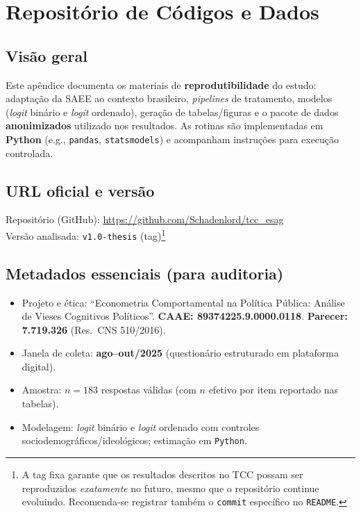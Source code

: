 \begin{apendicesenv}
\begin{landscape}
\begin{ThreePartTable}
\begin{longtable}
\bottomrule 
\insertTableNotes 
\end{longtable} 
\end{ThreePartTable}


\endgroup
\end{landscape}

\chapter{Repositório de Códigos e Dados}\label{ap:repo}

\section{Visão geral}
Este apêndice documenta os materiais de \textbf{reprodutibilidade} do estudo: adaptação da SAEE ao contexto brasileiro, \textit{pipelines} de tratamento, modelos (\textit{logit} binário e \textit{logit} ordenado), geração de tabelas/figuras e o pacote de dados \textbf{anonimizados} utilizado nos resultados. As rotinas são implementadas em \textbf{Python} (e.g., \texttt{pandas}, \texttt{statsmodels}) e acompanham instruções para execução controlada.

\section{URL oficial e versão}
Repositório (GitHub): \url{https://github.com/Schadenlord/tcc_esag}\\
Versão analisada: \texttt{v1.0-thesis} (tag)\footnote{A tag fixa garante que os resultados descritos no TCC possam ser reproduzidos \emph{exatamente} no futuro, mesmo que o repositório continue evoluindo. Recomenda-se registrar também o \texttt{commit} específico no \texttt{README}.}

\section{Metadados essenciais (para auditoria)}
\begin{itemize}
  \item Projeto e ética: ``Econometria Comportamental na Política Pública: Análise de Vieses Cognitivos Políticos''. \textbf{CAAE: 89374225.9.0000.0118}. \textbf{Parecer: 7.719.326} (Res.~CNS 510/2016).
  \item Janela de coleta: \textbf{ago–out/2025} (questionário estruturado em plataforma digital).
  \item Amostra: \textbf{$n=183$} respostas válidas (com $n$ efetivo por item reportado nas tabelas).
  \item Modelagem: \textit{logit} binário e \textit{logit} ordenado com controles sociodemográficos/ideológicos; estimação em \texttt{Python}.
\end{itemize}


\end{apendicesenv}
